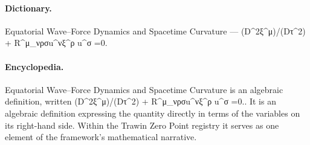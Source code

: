 \paragraph{Dictionary.}
Equatorial Wave–Force Dynamics and Spacetime Curvature — (D\textasciicircum{}2ξ\textasciicircum{}μ)/(Dτ\textasciicircum{}2) + R\textasciicircum{}μ\_νρσu\textasciicircum{}νξ\textasciicircum{}ρ u\textasciicircum{}σ =0.

\paragraph{Encyclopedia.}
Equatorial Wave–Force Dynamics and Spacetime Curvature is an algebraic definition, written (D\textasciicircum{}2ξ\textasciicircum{}μ)/(Dτ\textasciicircum{}2) + R\textasciicircum{}μ\_νρσu\textasciicircum{}νξ\textasciicircum{}ρ u\textasciicircum{}σ =0.. It is an algebraic definition expressing the quantity directly in terms of the variables on its right-hand side. Within the Trawin Zero Point registry it serves as one element of the framework's mathematical narrative.

